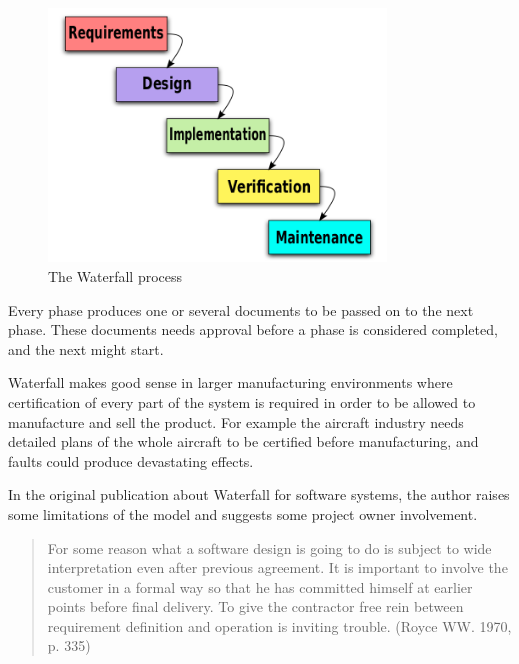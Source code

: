 \documentclass[11pt]{book}
\begin{document}
\begin{figure}[H]
      \centering
      \includegraphics[width=0.8\textwidth]{Figures/Prestudy/Waterfall.png}
      \caption{The Waterfall process}
      \label{fig:pre_waterfall}
\end{figure}


Every phase produces one or several documents to be passed on to the next phase. These documents needs approval before a phase is considered completed, and the next might start.

Waterfall makes good sense in larger manufacturing environments where certification of every part of the system is required in order to be allowed to manufacture and sell the product. For example the aircraft industry needs detailed plans of the whole aircraft to be certified before manufacturing, and faults could produce devastating effects.

In the original publication about Waterfall for software systems, the author raises some limitations of the model and suggests some project owner involvement.

\begin{quotation}
For some reason what a software design is going to do is subject to wide interpretation even after previous agreement. It is important to involve the customer in a formal way so that he has committed himself at earlier points before final delivery. To give the contractor free rein between requirement definition and operation is inviting trouble. (Royce WW. 1970, p. 335)
\end{quotation}
\end{document}
